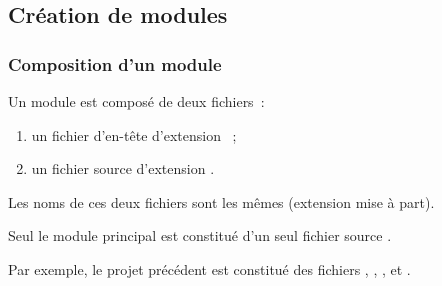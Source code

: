 \subsection{Création de modules}

\begin{frame}[fragile]
\frametitle{Composition d'un module}
Un module est composé de deux fichiers~:
\begin{enumerate}
    \item un \alert{fichier d'en-tête} d'extension ~;
    \item un \alert{fichier source} d'extension .
\end{enumerate}
\medskip

Les noms de ces deux fichiers sont les mêmes (extension mise à part).
\medskip

\begin{center}
\end{center}

Seul le module principal est constitué d'un seul fichier source .
\begin{center}
\end{center}
\bigskip

Par exemple, le projet précédent est constitué des fichiers
, , , 
et .
\end{frame}

